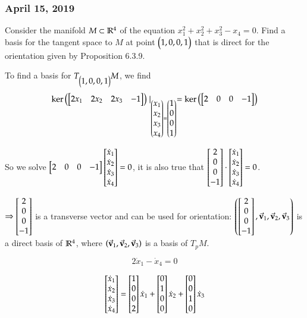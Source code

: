 \subsubsection*{April 15, 2019}

 Consider the manifold $M \subset \mathbb{R}^4$ of the equation $x_1^2 + x_2^2 + x_3^2 - x_4 = 0$. Find a basis for the tangent space to $M$ at point $\begin{pmatrix} 1, 0, 0, 1 \end{pmatrix}$ that is direct for the orientation given by Proposition 6.3.9. 

To find a basis for $T_{\begin{pmatrix} 1, 0, 0, 1 \end{pmatrix}}M$, we find
\[\mathrm{ker} \left( \begin{bmatrix} 2x_1 & 2x_2 & 2x_3 & -1 \end{bmatrix} \right)\mid_{\begin{pmatrix} x_1 \\ x_2 \\ x_3 \\ x_4 \end{pmatrix}=\begin{pmatrix} 1 \\ 0 \\ 0 \\ 1 \end{pmatrix}} = \mathrm{ker} \left( \begin{bmatrix} 2 & 0 & 0 & -1 \end{bmatrix} \right)\]

So we solve $\begin{bmatrix} 2 & 0 & 0 & -1 \end{bmatrix}\begin{bmatrix} \dot{x}_1 \\ \dot{x}_2 \\ \dot{x}_3 \\ \dot{x}_4 \end{bmatrix}=0$, it is also true that $\begin{bmatrix} 2 \\ 0 \\ 0 \\ -1 \end{bmatrix}\cdot \begin{bmatrix} \dot{x}_1 \\ \dot{x}_2 \\ \dot{x}_3 \\ \dot{x}_4 \end{bmatrix}=0$. 

$\Rightarrow \begin{bmatrix} 2 \\ 0 \\ 0 \\ -1 \end{bmatrix}$ is a transverse vector and can be used for orientation: $\left( \begin{bmatrix} 2 \\ 0 \\ 0 \\ -1 \end{bmatrix}, \vec{\textbf{v}}_1, \vec{\textbf{v}}_2, \vec{\textbf{v}}_3 \right)$ is a direct basis of $\mathbb{R}^4$, where $\left( \vec{\textbf{v}}_1, \vec{\textbf{v}}_2, \vec{\textbf{v}}_3 \right)$ is a basis of $T_p M$. 

\[2\dot{x}_1 - \dot{x}_4=0\]

\[\begin{bmatrix} \dot{x}_1 \\ \dot{x}_2 \\ \dot{x}_3 \\ \dot{x}_4 \end{bmatrix} = \begin{bmatrix} 1 \\ 0 \\ 0 \\ 2 \end{bmatrix}\dot{x}_1 + \begin{bmatrix} 0 \\ 1 \\ 0 \\ 0 \end{bmatrix}\dot{x}_2 + \begin{bmatrix} 0 \\ 0 \\ 1 \\ 0 \end{bmatrix}\dot{x}_3\]

